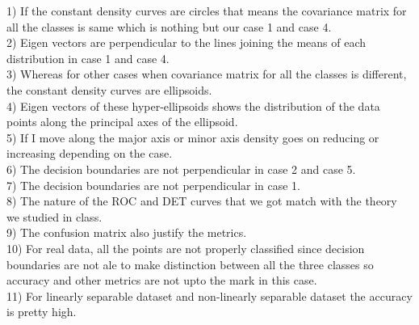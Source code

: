 1) If the constant density curves are circles that means the covariance matrix for all the classes is same which is nothing but our case 1 and case 4.\\
2) Eigen vectors are perpendicular to the lines joining the means of each distribution in case 1 and case 4.\\
3) Whereas for other cases when covariance matrix for all the classes is different, the constant density curves are ellipsoids.\\
4) Eigen vectors of these hyper-ellipsoids shows the distribution of the data points along the principal axes of the ellipsoid.\\
5) If I move along the major axis or minor axis density goes on reducing or increasing depending on the case.\\
6) The decision boundaries are not perpendicular in case 2 and case 5.\\
7) The decision boundaries are not perpendicular in case 1.\\
8) The nature of the ROC and DET curves that we got match with the theory we studied in class.\\
9) The confusion matrix also justify the metrics.\\
10) For real data, all the points are not properly classified since decision boundaries are not ale to make distinction between all the three classes so accuracy and other metrics are not upto the mark in this case.\\
11) For linearly separable dataset and non-linearly separable dataset the accuracy is pretty high.\\